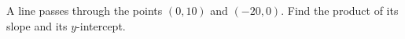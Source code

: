 A line passes through the points $(0,10)$ and $(-20,0)$. Find the product of its slope and its $y$-intercept.
